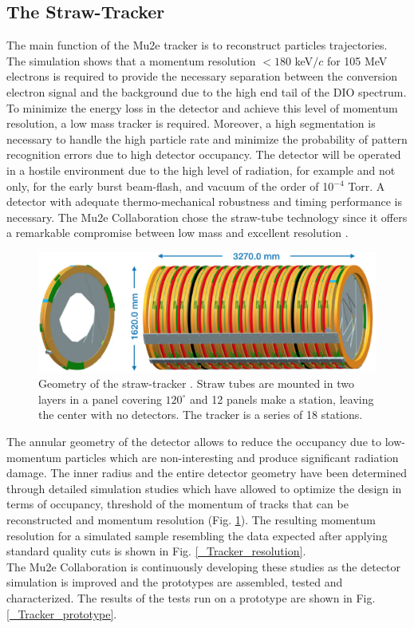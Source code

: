 \documentclass[12pt,a4paper,openright, oneside, titlepage]{book} %
\begin{document}
\subsection{The Straw-Tracker}
The main function of the Mu2e tracker is to reconstruct particles trajectories. 
The simulation shows that a momentum resolution $<180$ keV$/c$ for 105 MeV electrons is required to provide the necessary separation between the conversion electron signal and the background due to the high end tail of the DIO spectrum. 
To minimize the energy loss in the detector and achieve this level of momentum resolution, a low mass tracker is required. 
Moreover, a high segmentation is necessary to handle the high particle rate and minimize the probability of pattern recognition errors due to high detector occupancy.
The detector will be operated in a hostile environment due to the high level of radiation, for example and not only, for the early burst beam-flash, and vacuum of the order of 10$^{-4}$ Torr.
A detector with adequate thermo-mechanical robustness and timing performance is necessary.
The Mu2e Collaboration chose the straw-tube technology since it offers a remarkable compromise between low mass and excellent resolution \cite{Tracker:2016} \cite{Tracker:2018}.

\begin{figure}[h!]
\centering
\includegraphics[scale=0.5]{Tracker_2}
\caption[Straw-tube tracker]{Geometry of the straw-tracker \cite{Manolis}. 
Straw tubes are mounted in two layers in a panel covering $120^\circ$ and 12 panels make a station, leaving the center with no detectors. The tracker is a series of 18 stations.}
\label{_tracker}
\end{figure}

\noindent
The annular geometry of the detector allows to reduce the occupancy due to low-momentum particles which are non-interesting and produce significant radiation damage.
The inner radius and the entire detector geometry have been determined through detailed simulation studies which have allowed to optimize the design in terms of occupancy, threshold of the momentum of tracks that can be reconstructed and momentum resolution (Fig. \ref{_tracker}).
The resulting momentum resolution for a simulated sample resembling the data expected after applying standard quality cuts is shown in Fig. \ref{_Tracker_resolution}.\\
The Mu2e Collaboration is continuously developing these studies as the detector simulation is improved and the prototypes are assembled, tested and characterized. The results of the tests run on a prototype are shown in Fig. \ref{_Tracker_prototype}.
\end{document}
